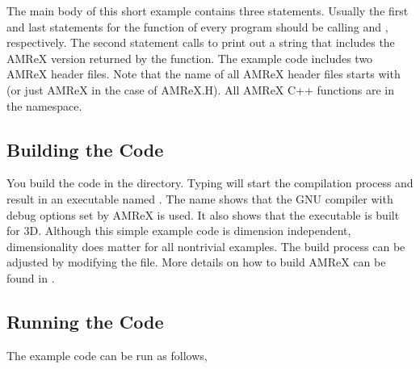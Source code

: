 \documentclass[letterpaper,10pt,english]{sphinxmanual}
\begin{document}
\sphinxAtStartPar
The main body of this short example contains three statements.  Usually the
first and last statements for the  function of every
program should be calling  and ,
respectively. The second statement calls  to print out a
string that includes the AMReX version returned by the 
function. The example code includes two AMReX header files. Note that the name
of all AMReX header files starts with  (or just AMReX in the case of
AMReX.H). All AMReX C++ functions are in the  namespace.


\subsection{Building the Code}
\label{\detokenize{GettingStarted:building-the-code}}
\sphinxAtStartPar
You build the code in the  directory.
Typing  will start the compilation process and result in an executable
named . The name shows that the GNU compiler with debug
options set by AMReX is used.  It also shows that the executable is built for
3D. Although this simple example code is dimension independent, dimensionality
does matter for all non\sphinxhyphen{}trivial examples. The build process can be adjusted by
modifying the  file.  More
details on how to build AMReX can be found in {\hyperref[\detokenize{BuildingAMReX_Chapter:chap-buildingamrex}]{}}.


\subsection{Running the Code}
\label{\detokenize{GettingStarted:running-the-code}}
\sphinxAtStartPar
The example code can be run as follows,

\begin{sphinxVerbatim}[commandchars=\\\{\}]
\end{sphinxVerbatim}
\end{document}
